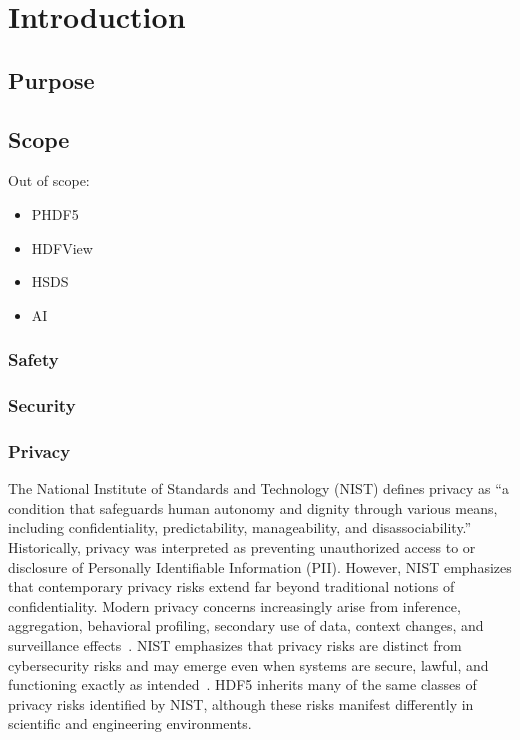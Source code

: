 \documentclass[../main.tex]{subfiles}
\begin{document}
\section{Introduction}
\label{sec:intro}

\subsection{Purpose}

\subsection{Scope}

Out of scope:
\begin{itemize}
    \item PHDF5
    \item HDFView
    \item HSDS
    \item AI
\end{itemize}

\subsubsection{Safety}

\subsubsection{Security}

\subsubsection{Privacy}
The National Institute of Standards and Technology (NIST) defines privacy as “a condition that safeguards 
human autonomy and dignity through various means, including confidentiality, predictability, manageability, 
and disassociability.” Historically, privacy was interpreted as preventing unauthorized access to or 
disclosure of Personally Identifiable Information (PII). However, NIST emphasizes that contemporary 
privacy risks extend far beyond traditional notions of confidentiality. Modern privacy concerns increasingly 
arise from inference, aggregation, behavioral profiling, secondary use of data, context changes, and 
surveillance effects~\cite{nist_privacy_framework_2020}. NIST emphasizes that privacy risks are distinct from cybersecurity risks and 
may emerge even when systems are secure, lawful, and functioning exactly as intended~\cite{brooks2017privacy}. 
HDF5 inherits many of the same classes of privacy risks identified by NIST, although these risks manifest 
differently in scientific and engineering environments. 
\end{document}
